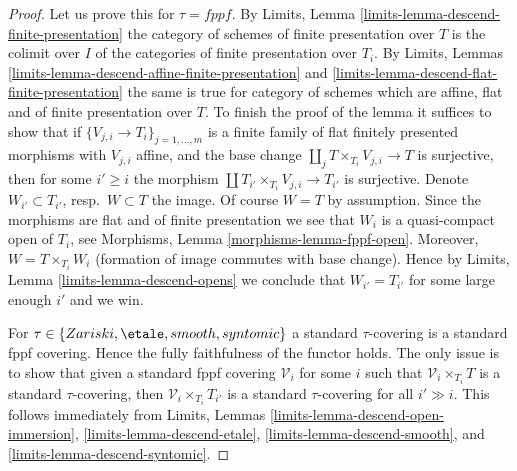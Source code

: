 \begin{proof}
Let us prove this for $\tau = fppf$.
By Limits, Lemma \ref{limits-lemma-descend-finite-presentation}
the category of schemes of finite presentation over $T$ is the
colimit over $I$ of the categories of finite presentation over $T_i$. By
Limits, Lemmas \ref{limits-lemma-descend-affine-finite-presentation}
and \ref{limits-lemma-descend-flat-finite-presentation}
the same is true for category of schemes which are affine, flat and
of finite presentation over $T$.
To finish the proof of the lemma it suffices to show that if
$\{V_{j, i} \to T_i\}_{j = 1, \ldots, m}$ is a finite family of
flat finitely presented morphisms with $V_{j, i}$ affine, and the
base change $\coprod_j T \times_{T_i} V_{j, i} \to T$ is surjective,
then for some $i' \geq i$ the morphism
$\coprod T_{i'} \times_{T_i} V_{j, i} \to T_{i'}$ is surjective.
Denote $W_{i'} \subset T_{i'}$, resp.\ $W \subset T$ the image.
Of course $W = T$ by assumption.
Since the morphisms are flat and of finite presentation we see that
$W_i$ is a quasi-compact open of $T_i$, see
Morphisms, Lemma \ref{morphisms-lemma-fppf-open}.
Moreover, $W = T \times_{T_i} W_i$ (formation of image commutes
with base change). Hence by
Limits, Lemma \ref{limits-lemma-descend-opens}
we conclude that $W_{i'} = T_{i'}$ for some large enough $i'$
and we win.

\medskip\noindent
For $\tau \in \{Zariski, \etale, smooth, syntomic\}$ a standard $\tau$-covering
is a standard fppf covering. Hence the fully faithfulness of the functor
holds. The only issue is to show that given a standard fppf covering
$\mathcal{V}_i$ for some $i$ such that $\mathcal{V}_i \times_{T_i} T$
is a standard $\tau$-covering, then $\mathcal{V}_i \times_{T_i} T_{i'}$
is a standard $\tau$-covering for all $i' \gg i$. This follows immediately
from Limits, Lemmas
\ref{limits-lemma-descend-open-immersion},
\ref{limits-lemma-descend-etale},
\ref{limits-lemma-descend-smooth}, and
\ref{limits-lemma-descend-syntomic}.
\end{proof}

